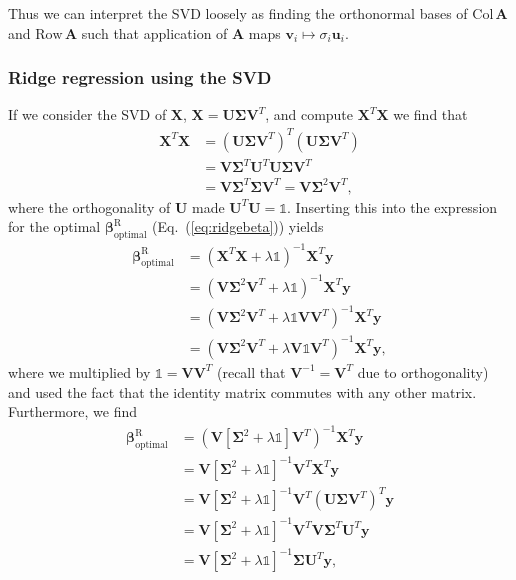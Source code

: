 \documentclass[a4paper, twocolumn]{article}
\newcommand{\eq} [1]{Eq.\ (\ref{eq:#1})}
\begin{document}
Thus we can interpret the SVD loosely as finding the orthonormal bases of $\text{Col}\,\mathbf{A}$ and $\text{Row}\,\mathbf{A}$ such that application of $\mathbf{A}$ maps $\mathbf{v}_i\mapsto \sigma_i\mathbf{u}_i$.

\subsubsection{Ridge regression using the SVD}
If we consider the SVD of $\mathbf{X}$, $\mathbf{X}=\mathbf{U}\bm\Sigma \mathbf{V}^T$, and compute $\mathbf{X}^T\mathbf{X}$ we find that 
\begin{align}
\mathbf{X}^T\mathbf{X} &= \left(\mathbf{U}\bm\Sigma \mathbf{V}^T\right)^T \left(\mathbf{U}\bm\Sigma \mathbf{V}^T\right) \nonumber \\
%
&= \mathbf{V}\bm\Sigma^T \mathbf{U}^T \mathbf{U}\bm\Sigma \mathbf{V}^T \nonumber \\
%
&= \mathbf{V}\bm\Sigma^T \bm\Sigma \mathbf{V}^T = \mathbf{V}\bm\Sigma^2\mathbf{V}^T,
\end{align}
where the orthogonality of $\mathbf{U}$ made $\mathbf{U}^T\mathbf{U}=\mathds{1}$. Inserting this into the expression for the optimal $\bm\beta_\text{optimal}^\text{R}$ (\eq{ridgebeta}) yields\autocite{trevor2009elements}
\begin{align}
\bm\beta^\text{R}_\text{optimal} &= \left(\mathbf{X}^T\mathbf{X}+\lambda\mathds{1}\right)^{-1}\mathbf{X}^T\mathbf{y} \nonumber \\
%
&= \left(\mathbf{V}\bm\Sigma^2\mathbf{V}^T +\lambda\mathds{1}\right)^{-1}\mathbf{X}^T\mathbf{y} \nonumber \\
%
&= \left(\mathbf{V}\bm\Sigma^2\mathbf{V}^T +\lambda\mathds{1}\mathbf{V}\mathbf{V}^T\right)^{-1}\mathbf{X}^T\mathbf{y} \nonumber \\
%
&= \left(\mathbf{V}\bm\Sigma^2\mathbf{V}^T +\lambda\mathbf{V}\mathds{1}\mathbf{V}^T\right)^{-1}\mathbf{X}^T\mathbf{y}, \nonumber
\end{align}
where we multiplied by $\mathds{1}=\mathbf{V}\mathbf{V}^T$ (recall that $\mathbf{V}^{-1}=\mathbf{V}^T$ due to orthogonality) and used the fact that the identity matrix commutes with any other matrix. Furthermore, we find
\begin{align}
\bm\beta^\text{R}_\text{optimal}&= \left(\mathbf{V}\left[\bm\Sigma^2 +\lambda\mathds{1}\right]\mathbf{V}^T\right)^{-1}\mathbf{X}^T\mathbf{y} \nonumber \\
%
&= \mathbf{V}\left[\bm\Sigma^2 +\lambda\mathds{1}\right]^{-1}\mathbf{V}^T\mathbf{X}^T\mathbf{y}  \label{eq:inv}\\
%
&= \mathbf{V}\left[\bm\Sigma^2 +\lambda\mathds{1}\right]^{-1}\mathbf{V}^T\left(\mathbf{U}\bm\Sigma \mathbf{V}^T\right)^T\mathbf{y} \nonumber \\
%
&= \mathbf{V}\left[\bm\Sigma^2 +\lambda\mathds{1}\right]^{-1}\mathbf{V}^T \mathbf{V}\bm\Sigma^T \mathbf{U}^T \mathbf{y} \nonumber \\
%
&= \mathbf{V}\left[\bm\Sigma^2 +\lambda\mathds{1}\right]^{-1}\bm\Sigma \mathbf{U}^T \mathbf{y},
\end{align}
\end{document}
